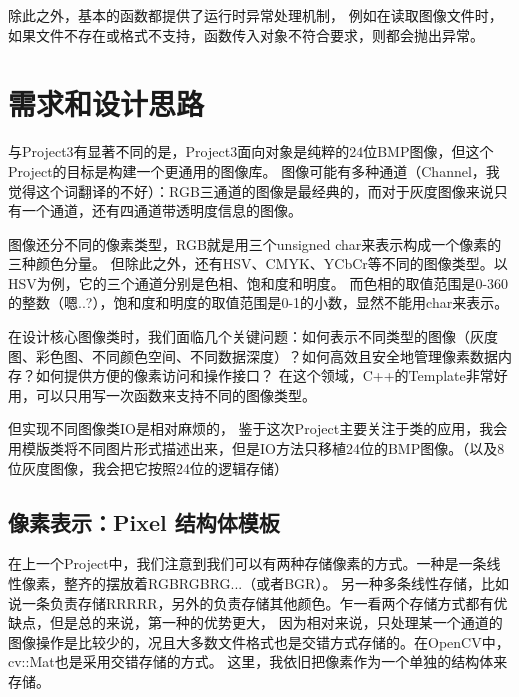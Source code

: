 \documentclass[11pt]{article}
\begin{document}
除此之外，基本的函数都提供了运行时异常处理机制，
例如在读取图像文件时，如果文件不存在或格式不支持，函数传入对象不符合要求，则都会抛出异常。

\section{需求和设计思路}
与Project3有显著不同的是，Project3面向对象是纯粹的24位BMP图像，但这个Project的目标是构建一个更通用的图像库。
图像可能有多种通道（Channel，我觉得这个词翻译的不好）：RGB三通道的图像是最经典的，而对于灰度图像来说只有一个通道，还有四通道带透明度信息的图像。


图像还分不同的像素类型，RGB就是用三个unsigned char来表示构成一个像素的三种颜色分量。
但除此之外，还有HSV、CMYK、YCbCr等不同的图像类型。以HSV为例，它的三个通道分别是色相、饱和度和明度。
而色相的取值范围是0-360的整数（嗯..?），饱和度和明度的取值范围是0-1的小数，显然不能用char来表示。


在设计核心图像类时，我们面临几个关键问题：如何表示不同类型的图像（灰度图、彩色图、不同颜色空间、不同数据深度）？如何高效且安全地管理像素数据内存？如何提供方便的像素访问和操作接口？
在这个领域，C++的Template非常好用，可以只用写一次函数来支持不同的图像类型。


但实现不同图像类IO是相对麻烦的，
鉴于这次Project主要关注于类的应用，我会用模版类将不同图片形式描述出来，但是IO方法只移植24位的BMP图像。（以及8位灰度图像，我会把它按照24位的逻辑存储）

\subsection{像素表示：Pixel 结构体模板}
在上一个Project中，我们注意到我们可以有两种存储像素的方式。一种是一条线性像素，整齐的摆放着RGBRGBRG...（或者BGR）。
另一种多条线性存储，比如说一条负责存储RRRRR，另外的负责存储其他颜色。乍一看两个存储方式都有优缺点，但是总的来说，第一种的优势更大，
因为相对来说，只处理某一个通道的图像操作是比较少的，况且大多数文件格式也是交错方式存储的。在OpenCV中，cv::Mat也是采用交错存储的方式。
这里，我依旧把像素作为一个单独的结构体来存储。
\end{document}
